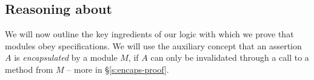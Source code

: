 {{%
%

\newcommand{\vertsp} {\vspace{.05in}} 
 
\subsection{Reasoning about \Nec}
\label{s:approach}

{We will now outline the key ingredients of  our logic with which we prove
that modules obey \Nec specifications. 
We will use the auxiliary concept that  
an assertion $A$ is \emph{encapsulated} by
a module $M$, if  $A$  can only be invalidated through 
a call to a method from $M$ -- more   in \S \ref{s:encaps-proof}.}

 
% 

}}
